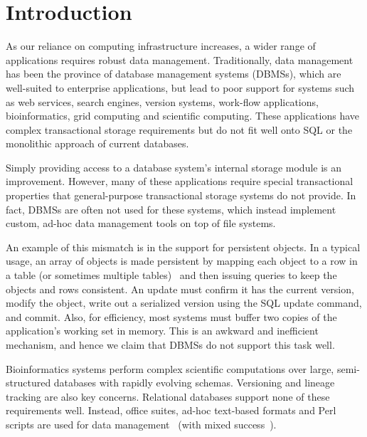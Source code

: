 \documentclass[letterpaper,twocolumn,10pt]{article}
\begin{document}




\section{Introduction}

As our reliance on computing infrastructure increases, a wider range of 
applications requires robust data management.  Traditionally, data management
has been the province of database management systems (DBMSs), which are
well-suited to enterprise applications, but lead to poor support for
systems such as web services, search engines, version systems, work-flow 
applications, bioinformatics, grid computing and scientific computing.  These 
applications have complex transactional storage requirements
but do not fit well
onto SQL or the monolithic approach of current databases.  

Simply providing
access to a database system's internal storage module is an improvement.
However, many of these applications require special transactional properties 
that general-purpose transactional storage systems do not provide.  In
fact, DBMSs are often not used for these systems, which instead
implement custom, ad-hoc data management tools on top of file
systems.

An example of this mismatch is in the support for
persistent objects.
In a typical usage, an array of objects is made persistent by
mapping each object to a row in a table (or sometimes multiple
tables)~\cite{hibernate} and then issuing queries to keep the objects and
rows consistent. An update must confirm it has the current
version, modify the object, write out a serialized version using the
SQL update command, and commit.  Also, for efficiency, most systems must 
buffer two copies of the application's working set in memory.  
This is an awkward and inefficient mechanism, and hence we claim that DBMSs do not support this task well.

Bioinformatics systems perform complex scientific
computations over large, semi-structured databases with rapidly evolving schemas.  Versioning and
lineage tracking are also key concerns.  Relational databases support
none of these requirements well.  Instead, office suites, ad-hoc
text-based formats and Perl scripts are used for data management~\cite{perl} (with mixed success~\cite{excel}).
\end{document}
